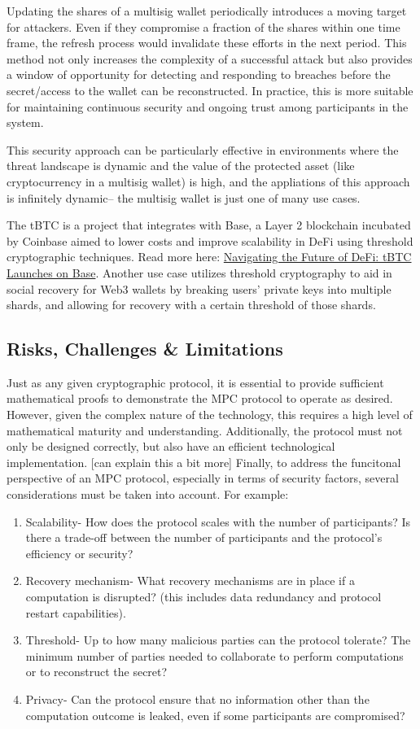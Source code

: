 \documentclass[12pt]{article}
\begin{document}
Updating the shares of a multisig wallet periodically introduces a moving target for attackers. Even if they compromise a fraction of the shares within one time frame, the refresh process would invalidate these efforts in the next period. This method not only increases the complexity of a successful attack but also provides a window of opportunity for detecting and responding to breaches before the secret/access to the wallet can be reconstructed. In practice, this is more suitable for maintaining continuous security and ongoing trust among participants in the system.

This security approach can be particularly effective in environments where the threat landscape is dynamic and the value of the protected asset (like cryptocurrency in a multisig wallet) is high, and the appliations of this approach is infinitely dynamic-- the multisig wallet is just one of many use cases.

The tBTC is a project that integrates with Base, a Layer 2 blockchain incubated by Coinbase aimed to lower costs and improve scalability in DeFi using threshold cryptographic techniques. Read more here: \href{https://blog.threshold.network/navigating-the-future-of-defi-tbtc-launches-on-base/}{Navigating the Future of DeFi: tBTC Launches on Base}. Another use case utilizes threshold cryptography to aid in social recovery for Web3 wallets by breaking users' private keys into multiple shards, and allowing for recovery with a certain threshold of those shards. 

\subsection{Risks, Challenges \& Limitations}
Just as any given cryptographic protocol, it is essential to provide sufficient mathematical proofs to demonstrate the MPC protocol to operate as desired. However, given the complex nature of the technology, this requires a high level of mathematical maturity and understanding. Additionally, the protocol must not only be designed correctly, but also have an efficient technological implementation. [can explain this a bit more] Finally, to address the funcitonal perspective of an MPC protocol, especially in terms of security factors, several considerations must be taken into account. For example:
\begin{enumerate}
    \item Scalability- How does the protocol scales with the number of participants? Is there a trade-off between the number of participants and the protocol's efficiency or security?
    \item Recovery mechanism- What recovery mechanisms are in place if a computation is disrupted? (this includes data redundancy and protocol restart capabilities).
    \item Threshold- Up to how many malicious parties can the protocol tolerate? The minimum number of parties needed to collaborate to perform computations or to reconstruct the secret?
    \item Privacy- Can the protocol ensure that no information other than the computation outcome is leaked, even if some participants are compromised?
\end{enumerate}
\end{document}

